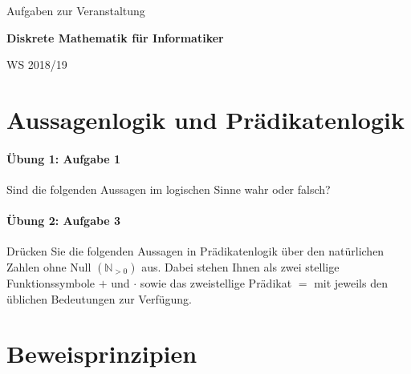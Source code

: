 \documentclass
[
  draft    = true,
  fontsize = 11pt,
  parskip  = half-,
  BCOR     = 0pt,
  DIV      = 11,
  ngerman,
  dvipsnames
]
{scrartcl}
\begin{document}

\thispagestyle{empty}
\begin{center}
  \vspace*{\fill}
  \normalsize
  \normalfont
  Aufgaben zur Veranstaltung\par
  \vspace{\baselineskip}
  \LARGE
  \bfseries
  Diskrete Mathematik für Informatiker\par
  \vspace{2\baselineskip}
  \normalsize
  \normalfont
  WS 2018/19\par
  \vspace*{\fill}
  \vspace*{\fill}
\end{center}

\clearpage
{}

\tableofcontents

\clearpage
{}

\section{Aussagenlogik und Prädikatenlogik}

\paragraph{Übung 1: Aufgabe 1}
Sind die folgenden Aussagen im logischen Sinne wahr oder falsch?

\paragraph{Übung 2: Aufgabe 3}
Drücken Sie die folgenden Aussagen in Prädikatenlogik über den natürlichen
Zahlen ohne Null $(\mathbb{N}_{>0})$ aus. Dabei stehen Ihnen als zwei stellige
Funktionssymbole $+$ und $\cdot$ sowie das zweistellige Prädikat $=$ mit jeweils
den üblichen Bedeutungen zur Verfügung.

\section{Beweisprinzipien}
\end{document}
